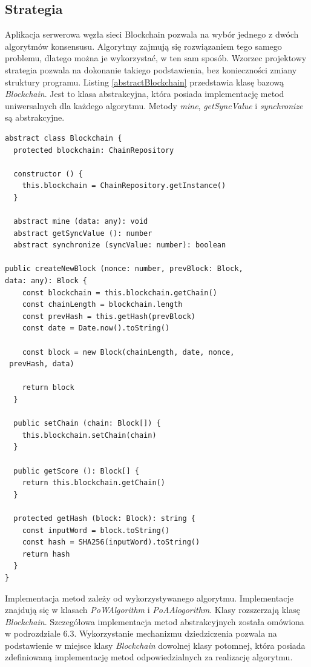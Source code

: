 \documentclass[a4paper,12pt]{book}
\begin{document}
\subsection{Strategia}

Aplikacja serwerowa węzła sieci Blockchain pozwala na wybór jednego z dwóch algorytmów konsensusu. Algorytmy zajmują się rozwiązaniem tego samego problemu, dlatego można je wykorzystać, w ten sam sposób. Wzorzec projektowy strategia pozwala na dokonanie takiego podstawienia, bez konieczności zmiany struktury programu. Listing \ref{abstractBlockchain} przedstawia klasę bazową \textit{Blockchain}.
Jest to klasa abstrakcyjna, która posiada implementację metod uniwersalnych dla każdego algorytmu. Metody \textit{mine}, \textit{getSyncValue} i \textit{synchronize} są abstrakcyjne.
 
\begin{lstlisting}[style=ES6, caption={Klasa \textit{Blockchain}.}, label={abstractBlockchain}]
abstract class Blockchain {
  protected blockchain: ChainRepository

  constructor () {
    this.blockchain = ChainRepository.getInstance()
  }

  abstract mine (data: any): void
  abstract getSyncValue (): number
  abstract synchronize (syncValue: number): boolean

public createNewBlock (nonce: number, prevBlock: Block, 
data: any): Block {
    const blockchain = this.blockchain.getChain()
    const chainLength = blockchain.length
    const prevHash = this.getHash(prevBlock)
    const date = Date.now().toString()

    const block = new Block(chainLength, date, nonce,
 prevHash, data)

    return block
  }

  public setChain (chain: Block[]) {
    this.blockchain.setChain(chain)
  }

  public getScore (): Block[] {
    return this.blockchain.getChain()
  }

  protected getHash (block: Block): string {
    const inputWord = block.toString()
    const hash = SHA256(inputWord).toString()
    return hash
  }
}
\end{lstlisting}

Implementacja metod zależy od wykorzystywanego algorytmu. Implementacje znajdują się w klasach \textit{PoWAlgorithm} i \textit{PoAAlogorithm}. Klasy rozszerzają klasę \textit{Blockchain}.
Szczegółowa implementacja metod abstrakcyjnych została omówiona w podrozdziale 6.3. Wykorzystanie mechanizmu dziedziczenia pozwala na podstawienie w miejsce klasy \textit{Blockchain} dowolnej klasy potomnej, która posiada zdefiniowaną implementację metod odpowiedzialnych za realizację algorytmu.
 
\end{document}
